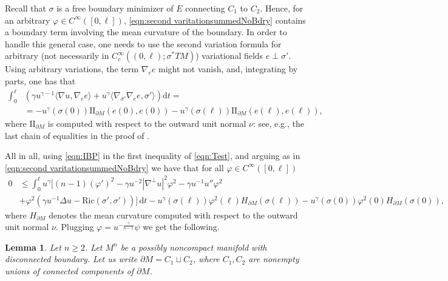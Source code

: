 \documentclass[12pt,a4paper,reqno]{amsart}
\newtheorem{lemma}{Lemma}
\theoremstyle{definition}
\renewcommand{\leq}{\leqslant}
\renewcommand{\geq}{\geqslant}
\newcommand{\D}{\nabla}
\begin{document}
{Recall that $\sigma$ is a free boundary minimizer of $E$ connecting $C_1$ to $C_2$. Hence, for an arbitrary $\varphi\in C^\infty([0,\ell])$,  \eqref{eqn:second varitationsummedNoBdry} contains a boundary term involving the mean curvature of the boundary. In order to handle this general case, one needs to use the  second variation formula for arbitrary (not necessarily in $C_c^\infty((0,\ell);\sigma^*TM)$) variational fields $e\perp\sigma'$. Using arbitrary variations, the term $\nabla_e e$ might not vanish, and, integrating by parts, one has that
\begin{equation}\label{eqn:IBP}
\begin{aligned}
\int_0^\ell &\left(\gamma u^{\gamma-1}\langle\nabla u,\nabla_e e\rangle + u^\gamma\langle \nabla_{\sigma'}\nabla_e e,\sigma'\rangle\right)\mathrm{d}t = \\ &= -u^\gamma(\sigma(0))\mathrm{II}_{\partial M}(e(0),e(0))
-u^\gamma(\sigma(\ell))\mathrm{II}_{\partial M}(e(\ell),e(\ell)),
\end{aligned}
\end{equation}
where $\mathrm{II}_{\partial M}$ is computed with respect to the outward unit normal $\nu$: see, e.g., the last chain of equalities in the proof of \cite[Lemma 2.5]{HongWang}.

All in all, using \eqref{eqn:IBP} in the first inequality of \eqref{eqn:Test}, and arguing as in \eqref{eqn:second varitationsummedNoBdry} we have that for all $\varphi\in C^{\infty}([0,\ell])$ 
\begin{equation}\label{eqn:second varitationsummed}
    \begin{aligned}
    0 &\leq \int_0^\ell u^\gamma\Big[(n-1)(\varphi')^2-\gamma u^{-2}|\D^\perp u|^2\varphi^2-\gamma u^{-1}u''\varphi^2 \\
    & +\varphi^2(\gamma u^{-1}\Delta u - \mathrm{Ric}(\sigma',\sigma'))\Big]\,\mathrm{d}t - u^\gamma(\sigma(\ell)) \varphi^2(\ell)H_{\partial M}(\sigma(\ell))-u^\gamma(\sigma(0)) \varphi^2(0)H_{\partial M}(\sigma(0)),
\end{aligned}
\end{equation}
where $H_{\partial M}$ denotes the mean curvature computed with respect to the outward unit normal $\nu$.
Plugging $\varphi=u^{-\frac{\gamma}{n-1}}\psi$ we get the following. 
\begin{lemma}\label{lem:SecondVariationGeneral}
    Let $n\geq 2$. Let $M^n$ be a possibly noncompact manifold with disconnected boundary. Let us write $\partial M=C_1\sqcup C_2$, where $C_1,C_2$ are nonempty unions of connected components of $\partial M$.
    

\end{lemma}}
\end{document}

